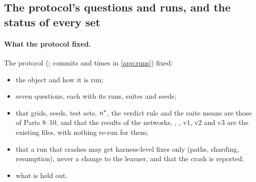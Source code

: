 \subsection{The protocol's questions and runs, and the status of every set}\label{app:questions}

\paragraph{What the protocol fixed.} The protocol (; commits and times in \cref{app:runs}) fixed:
\begin{itemize}
\item the object and how it is run;
\item seven questions, each with its runs, suites and seeds;
\item that grids, seeds, test sets, $n^{*}$, the verdict rule and the suite means are those of Parts 8--10, and that the results of the networks, , , v1, v2 and v3 are the existing files, with nothing re-run for them;
\item that a run that crashes may get harness-level fixes only (paths, sharding, resumption), never a change to the learner, and that the crash is reported;
\item what is held out.
\end{itemize}

